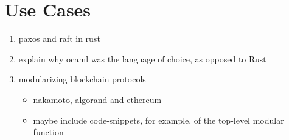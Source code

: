 

\chapter{Use Cases}
\label{cha:use_cases}

\begin{enumerate}
    \item paxos and raft in rust 
    \item explain why ocaml was the language of choice, as opposed to Rust 
    \item modularizing blockchain protocols
    \begin{itemize}
        \item nakamoto, algorand and ethereum
        \item maybe include code-snippets, for example, of the top-level modular function
    \end{itemize}
\end{enumerate}